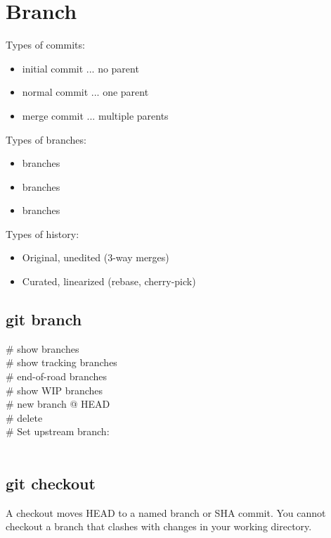 \section{Branch}
Types of commits:
\begin{itemize}
    \item initial commit ... no parent
    \item normal commit ... one parent
    \item merge commit ... multiple parents
\end{itemize}
Types of branches:
\begin{itemize}
    \item {} branches
    \item {} branches
    \item {} branches
\end{itemize}
Types of history:
\begin{itemize}
    \item Original, unedited (3-way merges)
    \item Curated, linearized (rebase, cherry-pick)
\end{itemize}

\subsection*{git branch}
 \# show branches \\
 \# show tracking branches \\
 \# end-of-road branches \\
 \# show WIP branches \\
 \# new branch @ HEAD \\
 \# delete \\
\# Set upstream branch:\\
 \\


\subsection*{git checkout}
{\footnotesize
A checkout moves HEAD to a named branch or SHA commit.  You cannot checkout a branch that clashes with changes in your working directory.}

